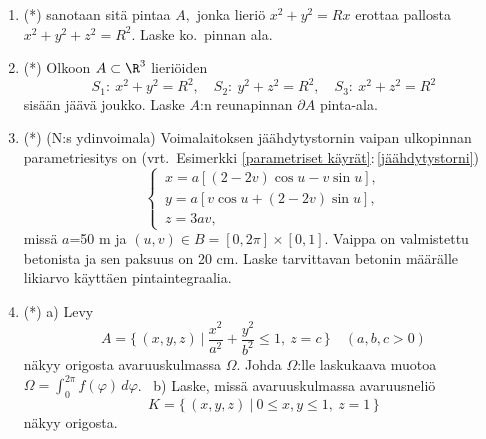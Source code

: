 \begin{enumerate}
\item (*)  
 sanotaan sitä pintaa $A,$ jonka lieriö $x^2+y^2=Rx$ erottaa pallosta
$x^2 + y^2 + z^2 = R^2$. Laske ko.\ pinnan ala.

\item (*)
Olkoon $A\subset\R^3$ lieriöiden
\[
S_1:\ x^2+y^2=R^2, \quad S_2:\ y^2+z^2=R^2, \quad S_3:\ x^2+z^2=R^2
\]
sisään jäävä joukko. Laske $A$:n reunapinnan $\partial A$ pinta-ala.

\item (*)  
(N:s ydinvoimala) Voimalaitoksen jäähdytystornin vaipan ulkopinnan parametriesitys on
(vrt.\ Esimerkki \ref{parametriset käyrät}:\,\ref{jäähdytystorni})
\[
\begin{cases}
\,x=a[(2-2v)\cos u-v\sin u], \\
\,y=a[v\cos u +(2-2v)\sin u], \\
\,z=3av,
\end{cases}
\]
missä $a$=50 m ja $(u,v)\in B= [0,2\pi]\times [0,1]$. Vaippa on valmistettu betonista ja sen
paksuus on 20 cm. Laske tarvittavan betonin määrälle likiarvo käyttäen pintaintegraalia.

\item (*)
a) Levy
\[
A=\{\,(x,y,z) \ | \ \frac{x^2}{a^2}+\frac{y^2}{b^2} \le 1,\ z=c\,\} \quad (a,b,c>0)
\]
näkyy origosta avaruuskulmassa $\Omega$. Johda $\Omega$:lle laskukaava muotoa
$\Omega=\int_0^{2\pi} f(\varphi)\,d\varphi$. \ b) Laske, missä avaruuskulmassa avaruusneliö
\[
K=\{\,(x,y,z) \ | \ 0 \le x,y \le 1,\ z=1\,\}
\]
näkyy origosta.

\end{enumerate}